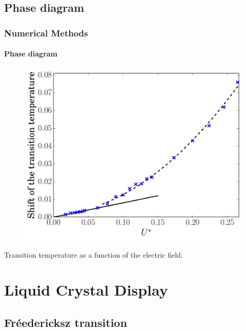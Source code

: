 \documentclass{beamer}
\begin{document}
\subsection{Phase diagram}
\begin{frame}
	\frametitle{Numerical Methods}
	\framesubtitle{Phase diagram}

\begin{figure}
\includegraphics[scale=0.48]{figures/electricField.pdf}
\end{figure}
\vspace{-0.6cm}
\center Transition temperature as a function of the electric field.
\end{frame}


\section{Liquid Crystal Display}
\subsection{Fréedericksz transition}
\end{document}
